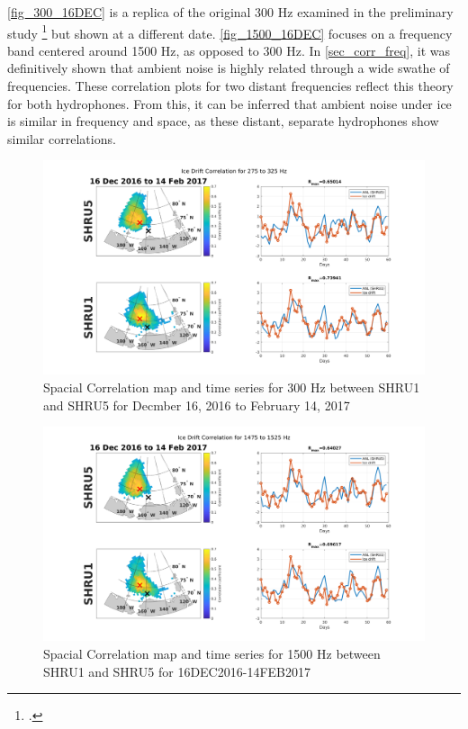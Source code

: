 \autoref{fig_300_16DEC} is a replica of the original 300 Hz examined in the preliminary study \footcite[]{Bonnel2021} but shown at a different date. \autoref{fig_1500_16DEC} focuses on a frequency band centered around 1500 Hz, as opposed to 300 Hz. In \autoref{sec_corr_freq}, it was definitively shown that ambient noise is highly related through a wide swathe of frequencies. These correlation plots for two distant frequencies reflect this theory for both hydrophones. From this, it can be inferred that ambient noise under ice is similar in frequency and space, as these distant, separate hydrophones show similar correlations.   %

\begin{figure}[p]
\centering
\includegraphics[scale=0.35]{Figures/300_spatial_corr_20161216-20170214_275_325.png}
\caption{Spacial Correlation map and time series for 300 Hz between SHRU1 and SHRU5 for Decmber 16, 2016 to February 14, 2017}
\label{fig_300_16DEC}
\end{figure}

\begin{figure}[p]
\centering
\includegraphics[scale=0.35]{Figures/1500_spatial_corr_20161216-20170214_1475_1525.png}
\caption{Spacial Correlation map and time series for 1500 Hz between SHRU1 and SHRU5 for 16DEC2016-14FEB2017}
\label{fig_1500_16DEC}
\end{figure} 

